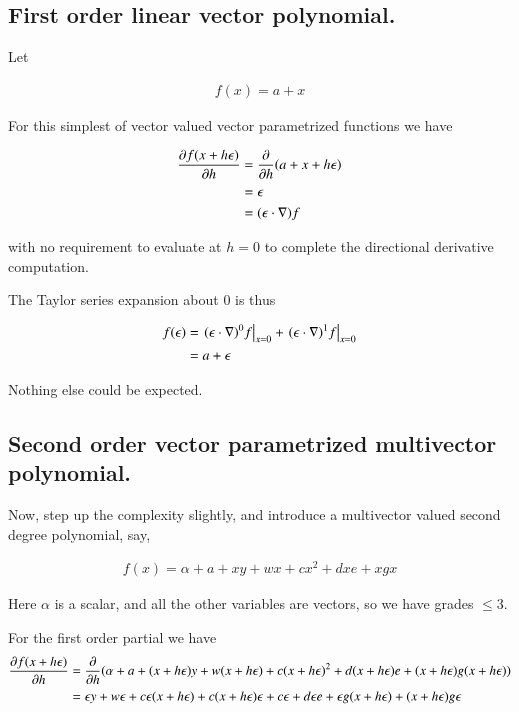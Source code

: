 \documentclass{article}
\begin{document}
\subsection{ First order linear vector polynomial. }

Let

\begin{align*}
f(x) = a + x
\end{align*}

For this simplest of vector valued vector parametrized functions we have

\begin{align*}
\PD{h}{f(x + h \epsilon)} 
&= \PD{h}{} (a + x + h \epsilon) \\
&= \epsilon \\
&= (\epsilon \cdot \grad) f
\end{align*}

with no requirement to evaluate at $h=0$ to complete the directional derivative computation.

The Taylor series expansion about $0$ is thus

\begin{align*}
f(\epsilon) 
&= \left. (\epsilon \cdot \grad)^0 f \right\vert_{x=0} + \left. (\epsilon \cdot \grad)^1 f  \right\vert_{x=0} \\
&= a + \epsilon \\
\end{align*}

Nothing else could be expected.

\subsection{ Second order vector parametrized multivector polynomial. }

Now, step up the complexity slightly, and introduce a multivector valued second degree polynomial, say,

\begin{align}\label{eqn:secondOrder}
f(x) = \alpha + a + x y + w x + c x^2 + d x e + x g x
\end{align}

Here $\alpha$ is a scalar, and all the other variables are vectors, so we have grades $\le 3$.

For the first order partial we have
\begin{align*}
\PD{h}{f(x + h \epsilon)} 
&= \PD{h}{} ( \alpha + a + (x + h\epsilon) y + w (x + h\epsilon) + c (x + h\epsilon)^2 + d (x + h\epsilon) e + (x + h\epsilon) g (x + h\epsilon) ) \\
&= 
\epsilon y 
+ w \epsilon
+ c \epsilon (x + h\epsilon) 
+ c (x + h\epsilon) \epsilon
+ c \epsilon 
+ d \epsilon e 
+ \epsilon g (x + h\epsilon) 
+ (x + h\epsilon) g \epsilon \\
\end{align*}
\end{document}
